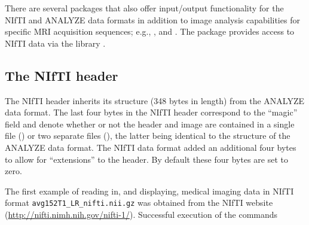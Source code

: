 \documentclass[
]{jss}
\begin{document}
There are several  packages that also offer input/output
functionality for the NIfTI and ANALYZE data formats in addition to
image analysis capabilities for specific MRI acquisition sequences;
e.g.,  \citep{AnalyzeFMRI}, 
\citep{pol-tab:fmri} and  \citep{tractor.base}. The
 package provides access to NIfTI data via the
 library \citep{Rniftilib}.

\subsection{The NIfTI header}
\label{sec:nifti-header}

The NIfTI header inherits its structure (348 bytes in length) from the
ANALYZE data format. The last four bytes in the NIfTI header correspond
to the ``magic'' field and denote whether or not the header and image
are contained in a single file () or two separate files (), the latter being identical to the structure
of the ANALYZE data format. The NIfTI data format added an additional
four bytes to allow for ``extensions'' to the header. By default these
four bytes are set to zero.

The first example of reading in, and displaying, medical imaging data in
NIfTI format \texttt{avg152T1\_LR\_nifti.nii.gz} was obtained from the
NIfTI website (\url{http://nifti.nimh.nih.gov/nifti-1/}). Successful
execution of the commands
\end{document}
